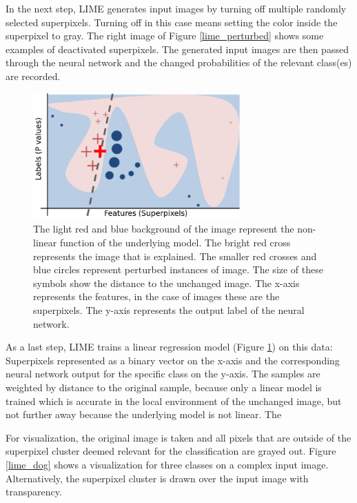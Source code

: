 In the next step, LIME generates input images by turning off multiple randomly selected superpixels. Turning off in this case means setting the color inside the superpixel to gray. The right image of Figure \ref{lime_perturbed} shows some examples of deactivated superpixels. The generated input images are then passed through the neural network and the changed probabilities of the relevant class(es) are recorded.

\begin{figure}[H]
\centering
\includegraphics[width=8cm]{chapters/02_methods/images/lime2.png}
\caption{
The light red and blue background of the image represent the non-linear function of the underlying model.
The bright red cross represents the image that is explained. The smaller red crosses and blue circles represent
perturbed instances of image. The size of these symbols show the distance to the unchanged image. The x-axis represents the features, in the case of images these are the superpixels. The y-axis represents the output label of the neural network.}
\label{lime_linear_regression}
\end{figure}

As a last step, LIME trains a linear regression model (Figure \ref{lime_linear_regression}) on this data: Superpixels represented as a binary vector on the x-axis and the corresponding neural network output for the specific class on the y-axis. The samples are weighted by distance to the original sample, because only a linear model is trained which is accurate in the local environment of the unchanged image, but not further away because the underlying model is not linear. The 

For visualization, the original image is taken and all pixels that are outside of the superpixel cluster deemed relevant for the classification are grayed out.
Figure \ref{lime_dog} shows a visualization for three classes on a complex input image. Alternatively, the superpixel cluster is drawn over the input image with transparency.

